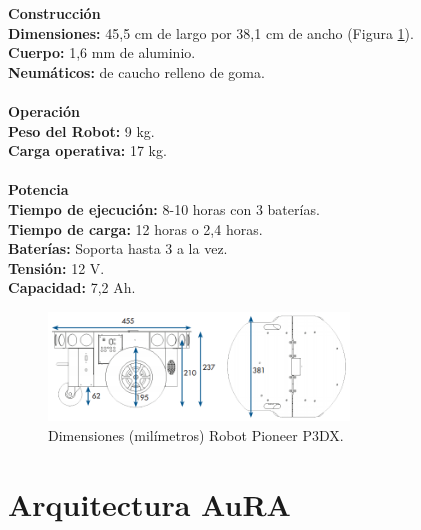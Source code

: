 \documentclass[11pt,twoside,A5]{article}
\newcommand{\reffigure}[1]{Figura \ref{#1}}
\newcommand{\refpfigure}[1]{(\reffigure{#1})}
\begin{document}
\noindent\textbf{Construcción}
\\
\indent\textbf{Dimensiones:} 45,5 cm de largo por 38,1 cm de ancho \refpfigure{fig:pioneer-dimensiones}.
\\
\indent\textbf{Cuerpo:} 1,6 mm de aluminio.
\\
\indent\textbf{Neumáticos:} de caucho relleno de goma.
\\\\
\noindent\textbf{Operación}
\\
\indent\textbf{Peso del Robot:} 9 kg.
\\
\indent\textbf{Carga operativa:} 17 kg.
\\\\
\noindent\textbf{Potencia}
\\
\indent\textbf{Tiempo de ejecución:} 8-10 horas con 3 baterías.
\\
\indent\textbf{Tiempo de carga:} 12 horas o 2,4 horas.
\\
\indent\textbf{Baterías:} Soporta hasta 3 a la vez.
\\
\indent\textbf{Tensión:} 12 V.
\\
\indent\textbf{Capacidad:} 7,2 Ah.

\begin{figure}[here]
	\centering
	\includegraphics[width=8cm]{pioneer-dimensiones.png} 
	\caption{Dimensiones (milímetros) Robot Pioneer P3DX.}
	\label{fig:pioneer-dimensiones}
\end{figure} 

\section*{Arquitectura AuRA}
\end{document}
